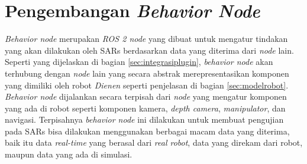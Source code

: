 \section{Pengembangan \emph{Behavior Node}}
\label{sec:behaviornode}

\emph{Behavior node} merupakan \emph{ROS 2 node} yang dibuat untuk mengatur tindakan yang akan dilakukan oleh SARs berdasarkan data yang diterima dari \emph{node} lain.
Seperti yang dijelaskan di bagian \ref{sec:integrasiplugin},
  \emph{behavior node} akan terhubung dengan \emph{node} lain yang secara abstrak merepresentasikan komponen yang dimiliki oleh robot \emph{Dienen} seperti penjelasan di bagian \ref{sec:modelrobot}.
\emph{Behavior node} dijalankan secara terpisah dari \emph{node} yang mengatur komponen yang ada di robot seperti komponen kamera, \emph{depth camera}, \emph{manipulator}, dan navigasi.
Terpisahnya \emph{behavior node} ini dilakukan untuk membuat pengujian pada SARs bisa dilakukan menggunakan berbagai macam data yang diterima,
  baik itu data \emph{real-time} yang berasal dari \emph{real robot},
  data yang direkam dari robot,
  maupun data yang ada di simulasi.

